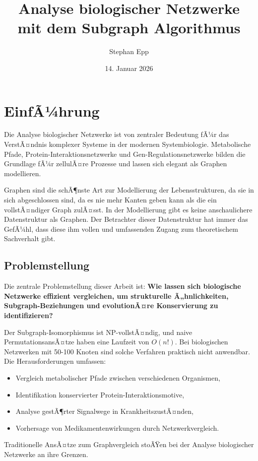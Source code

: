 ﻿\documentclass[a4paper,12pt]{article}
\title{\textbf{Analyse biologischer Netzwerke}\\{\Large mit dem Subgraph Algorithmus}}
\author{Stephan Epp}
\date{14. Januar 2026}
\theoremstyle{definition}
\begin{document}
	
\maketitle

\tableofcontents
\newpage

\section{EinfÃ¼hrung}

Die Analyse biologischer Netzwerke ist von zentraler Bedeutung fÃ¼r das VerstÃ¤ndnis komplexer Systeme in der modernen Systembiologie. Metabolische Pfade, Protein-Interaktions\-netzwerke und Gen-Regulationsnetzwerke bilden die Grundlage fÃ¼r zellulÃ¤re Prozesse und lassen sich elegant als Graphen modellieren.

Graphen sind die schÃ¶nste Art zur Modellierung der Lebensstrukturen, da sie in sich abgeschlossen sind, da es nie mehr Kanten geben kann als die ein vollstÃ¤ndiger Graph zulÃ¤sst. In der Modellierung gibt es keine anschaulichere Datenstruktur als Graphen. Der Betrachter dieser Datenstruktur hat immer das GefÃ¼hl, dass diese ihm vollen und umfassenden Zugang zum theoretischem Sachverhalt gibt. 

\subsection{Problemstellung}

Die zentrale Problemstellung dieser Arbeit ist: \textbf{Wie lassen sich biologische Netzwerke effizient vergleichen, um strukturelle Ã„hnlichkeiten, Subgraph-Beziehungen und evolutionÃ¤re Konservierung zu identifizieren?}

Der Subgraph-Isomorphismus ist NP-vollstÃ¤ndig, und naive PermutationsansÃ¤tze haben eine Laufzeit von $O(n!)$. Bei biologischen Netzwerken mit 50-100 Knoten sind solche Verfahren praktisch nicht anwendbar. Die Herausforderungen umfassen:
\begin{itemize}
	\item[-] Vergleich metabolischer Pfade zwischen verschiedenen Organismen,
	\item[-] Identifikation konservierter Protein-Interaktionsmotive,
	\item[-] Analyse gestÃ¶rter Signalwege in KrankheitszustÃ¤nden,
	\item[-] Vorhersage von Medikamentenwirkungen durch Netzwerkvergleich.
\end{itemize}
Traditionelle AnsÃ¤tze zum Graphvergleich stoÃŸen bei der Analyse biologischer Netzwerke an ihre Grenzen.
\end{document}
